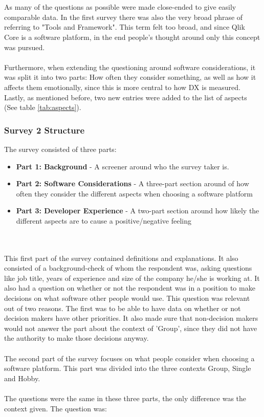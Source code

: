 \documentclass{cslthse-msc}
\begin{document}
    \\ \\
    As many of the questions as possible were made close-ended to give easily comparable data. In the first survey there was also the very broad phrase of referring to "Tools and Framework". This term felt too broad, and since Qlik Core is a software platform, in the end people's thought around only this concept was pursued.
    \\ \\
    Furthermore, when extending the questioning around software considerations, it was split it into two parts: How often they consider something, as well as how it affects them emotionally, since this is more central to how DX is measured. Lastly, as mentioned before, two new entries were added to the list of aspects (See table \ref{tab:aspects}).

    \subsubsection{Survey 2 Structure}

    The survey consisted of three parts:
    \begin{itemize}[label={}]
        \item \textbf{Part 1: Background} - A screener around who the survey taker is.
        \item \textbf{Part 2: Software Considerations} - A three-part section around of how often they consider the different aspects when choosing a software platform
        \item \textbf{Part 3: Developer Experience} - A two-part section around how likely the different aspects are to cause a positive/negative feeling
    \end{itemize}
    \\ \\
    This first part of the survey contained definitions and explanations. It also consisted of a background-check of whom the respondent was, asking questions like job title, years of experience and size of the company he/she is working at. It also had a question on whether or not the respondent was in a position to make decisions on what software other people would use. This question was relevant out of two reasons. The first was to be able to have data on whether or not decision makers have other priorities. It also made sure that non-decision makers would not answer the part about the context of 'Group', since they did not have the authority to make those decisions anyway.
    \\ \\
    The second part of the survey focuses on what people consider when choosing a
    software platform. This part was divided into the three contexts Group, Single and Hobby.
    \\ \\
    The questions were the same in these three parts, the only
    difference was the context given. The question was:
\end{document}
